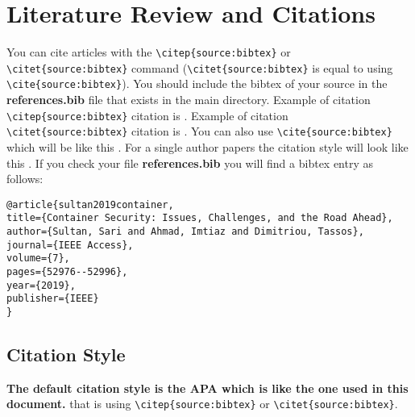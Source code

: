 \chapter{Literature Review and Citations}\label{chapter:litreview}
You can cite articles with the \texttt{\textbackslash citep\{source:bibtex\}} or \texttt{\textbackslash citet\{source:bibtex\}} command \big(\texttt{\textbackslash citet\{source:bibtex\}} is equal to using \texttt{\textbackslash cite\{source:bibtex\}}\big).
You should include the bibtex of your source in the \textbf{references.bib} file that exists in the main directory. 
Example of citation \texttt{\textbackslash citep\{source:bibtex\}} citation is \citep{sultan2019container}. 
Example of citation \texttt{\textbackslash citet\{source:bibtex\}} citation is \citet{sultan2019container}. 
You can also use \texttt{\textbackslash cite\{source:bibtex\}} which will be like this \cite{sultan2019container}.
For a single author papers the citation style will look like this \cite{sultan2019privacy}.
If you check your file \textbf{references.bib} you will find a bibtex entry as follows:


\begin{lstlisting}[frame=single]
@article{sultan2019container,
title={Container Security: Issues, Challenges, and the Road Ahead},
author={Sultan, Sari and Ahmad, Imtiaz and Dimitriou, Tassos},
journal={IEEE Access},
volume={7},
pages={52976--52996},
year={2019},
publisher={IEEE}
}
\end{lstlisting}

\section{Citation Style}
\textbf{The default citation style is the APA which is like the one used in this document.}  that is using \texttt{\textbackslash citep\{source:bibtex\}} or \texttt{\textbackslash citet\{source:bibtex\}}.



